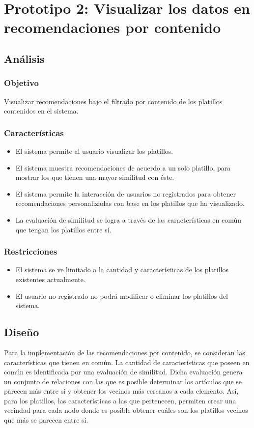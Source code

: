 \chapter{Prototipo 2: Visualizar los datos en recomendaciones por contenido}
\section{Análisis}
\subsection{Objetivo}
Visualizar recomendaciones bajo el filtrado por contenido de los platillos contenidos en el sistema. 

\subsection{Características}
\begin{itemize}
	\item El sistema permite al usuario visualizar los platillos.
	\item El sistema muestra recomendaciones de acuerdo a un solo platillo, para mostrar los que tienen una mayor similitud con éste.
	\item El sistema permite la interacción de usuarios no registrados para obtener recomendaciones personalizadas con base en los platillos que ha visualizado.
	\item La evaluación de similitud se logra a través de las características en común que tengan los platillos entre sí.
\end{itemize}

\subsection{Restricciones}
\begin{itemize}
	\item El sistema se ve limitado a la cantidad y características de los platillos existentes actualmente.
	\item El usuario no registrado no podrá modificar o eliminar los platillos del sistema.
\end{itemize}
\newpage
\section{Diseño}
Para la implementación de las recomendaciones por contenido, se consideran las características que tienen en común. La cantidad de características que poseen en común es identificada por una evaluación de similitud. Dicha evaluación genera un conjunto de relaciones con las que es posible determinar los artículos que se parecen más entre sí y obtener los vecinos más cercanos a cada elemento. Así, para los platillos, las características a las que pertenecen, permiten crear una vecindad para cada nodo donde es posible obtener cuáles son los platillos vecinos que más se parecen entre sí.


